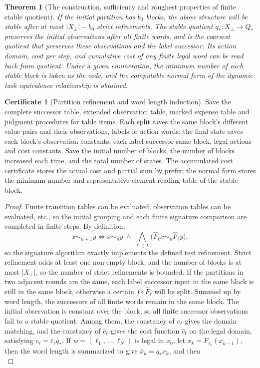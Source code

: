 \documentclass[12pt,a4paper,openany,notitlepage]{report}
\theoremstyle{plain}
\newtheorem{theorem}{Theorem}[chapter]
\theoremstyle{definition}
\newtheorem*{certificate}{Certificate}
\theoremstyle{remark}
\begin{document}
\begin{CJK*}
\begin{theorem}
[The construction, sufficiency and roughest properties of finite stable quotient]\label{hgov:thm:saturation}
If the initial partition has $b_0$ blocks, the above structure will be stable after at most $|X_\bot|-b_0$ strict refinements. The stable quotient $q_*:X_\bot\to Q_*$ preserves the initial observations after all finite words, and is the coarsest quotient that preserves these observations and the label successor. Its action domain, cost per step, and cumulative cost of any finite legal word can be read back from quotient. Under a given enumeration, the minimum number of each stable block is taken as the code, and the computable normal form of the dynamic task equivalence relationship is obtained.\end{theorem}
\begin{certificate}
[Partition refinement and word length induction]Save the complete successor table, extended observation table, marked expense table and judgment procedures for table items. Each split saves the same block's different value pairs and their observations, labels or action words; the final state saves each block's observation constants, each label successor same block, legal actions and cost constants. Save the initial number of blocks, the number of blocks increased each time, and the total number of states. The accumulated cost certificate stores the actual cost and partial sum by prefix; the normal form stores the minimum number and representative element reading table of the stable block.\end{certificate}
\begin{proof}
Finite transition tables can be evaluated, observation tables can be evaluated, etc., so the initial grouping and each finite signature comparison are completed in finite steps. By definition, \[
 x\sim_{n+1}y
 \Longleftrightarrow
 x\sim_ny\ \land\
 \bigwedge_{\ell\in L}
 \bigl(\widehat F_\ell x\sim_n\widehat F_\ell y\bigr),
\] so the signature algorithm exactly implements the defined test refinement. Strict refinement adds at least one non-empty block, and the number of blocks is at most $|X_\bot|$, so the number of strict refinements is bounded. If the partitions in two adjacent rounds are the same, each label successor input in the same block is still in the same block, otherwise a certain $f\circ\widehat F_\ell$ will be split. Summed up by word length, the successors of all finite words remain in the same block. The initial observation is constant over the block, so all finite successor observations fall to a stable quotient. Among them, the constancy of $e_\ell$ gives the domain matching, and the constancy of $\widehat c_\ell$ gives the cost function $\bar c_\ell$ on the legal domain, satisfying $c_\ell=\bar c_\ell q_*$. If $w=(\ell_1,\ldots,\ell_N)$ is legal in $x_0$, let $x_k=F_{\ell_k}(x_{k-1})$, then the word length is summarized to give $\bar x_k=q_*x_k$, and then \[
\]
\end{proof}
\end{CJK*}
\end{document}
